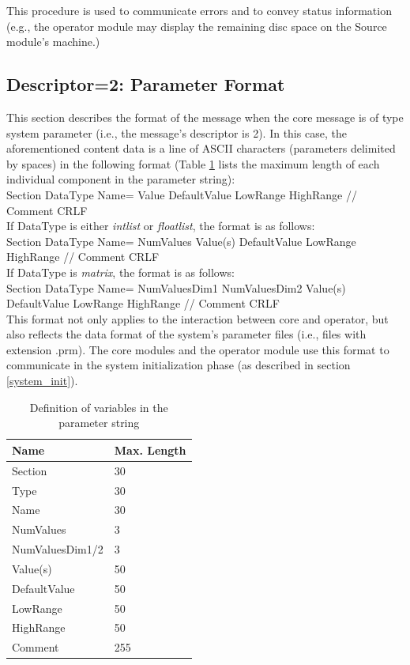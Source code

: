 \documentclass[letterpaper,oneside,12pt]{book}
\begin{document}
This procedure is used to communicate errors and to convey status information (e.g.,
the operator module may display the remaining disc space on the Source module's
machine.)

\subsection{Descriptor=2: Parameter Format}
\label{parameter_format}

This section describes the format of the message when the core message is of 
type system parameter (i.e., the message's descriptor is 2). In this case, the 
aforementioned content data is a line of ASCII characters (parameters delimited 
by spaces) in the following format (Table \ref{tab:parametervariables} lists the 
maximum length of each individual component in the parameter string):
\\[2ex]
Section DataType Name= Value DefaultValue LowRange HighRange // Comment CRLF \\[2ex]
If DataType is either \textit{intlist} or \textit{floatlist}, the format is
as follows: 
\\[2ex]
Section DataType Name= NumValues Value(s) DefaultValue LowRange HighRange // Comment CRLF \\[2ex]
If DataType is \textit{matrix}, the format is as follows:
\\[2ex]
Section DataType Name= NumValuesDim1 NumValuesDim2 Value(s) DefaultValue LowRange HighRange // Comment CRLF \\[2ex]

This format not only applies to the interaction between core and operator, but
also reflects the data format of the system's parameter files (i.e., files with
extension .prm). The core modules and the operator module use this format to
communicate in the system initialization phase (as described in section \ref{system_init}).

\begin{table}[ht]
 \centering
 \begin{tabular}{|l|l|}
  \hline
  \textbf{Name} & \textbf{Max. Length} \\
  \hline
  Section & 30\\
  \hline
  Type & 30 \\
  \hline
  Name & 30 \\
  \hline
  NumValues & 3 \\
  \hline
  NumValuesDim1/2 & 3 \\
  \hline
  Value(s) & 50 \\
  \hline
  DefaultValue & 50 \\
  \hline
  LowRange & 50 \\
  \hline
  HighRange & 50 \\
  \hline
  Comment & 255 \\
  \hline
 \end{tabular}
 \caption{Definition of variables in the parameter string}
 \label{tab:parametervariables}
\end{table}   
\end{document}
